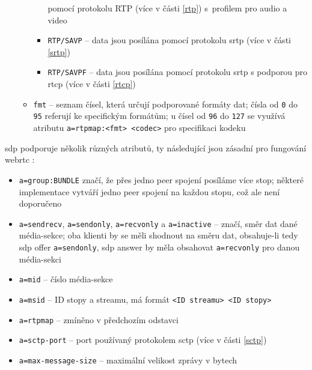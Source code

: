 \begin{itemize}
\begin{itemize}
\begin{itemize}
                              pomocí protokolu RTP (více v části \ref{rtp})
                              s~profilem pro audio a video
                        \item \texttt{RTP/SAVP} -- data jsou posílána
                              pomocí protokolu \gls{srtp} (více v části
                              \ref{srtp})
                        \item \texttt{RTP/SAVPF} -- data jsou posílána
                              pomocí protokolu \gls{srtp} s podporou pro
                              \gls{rtcp} (více v části \ref{rtcp})
                    \end{itemize}
              \item \texttt{fmt} -- seznam čísel, která určují
                    podporované formáty dat; čísla od \texttt{0} do
                    \texttt{95} referují ke specifickým formátům; u
                    čísel od \texttt{96} do \texttt{127} se
                    využívá atributu \texttt{a=rtpmap:<fmt> <codec>}
                    pro specifikaci kodeku
          \end{itemize}
\end{itemize}

\gls{sdp} podporuje několik různých atributů, ty následující jsou zásadní pro
fungování \gls{webrtc}
\parencite{WebRTCForTheCurious,IETF-RFC8866,IETF-RFC5888,IETF-RFC8841}:
\begin{itemize}
    \item \texttt{a=group:BUNDLE} značí, že přes jedno peer spojení
          posíláme více stop; některé implementace vytváří jedno peer spojení na
          každou stopu, což ale není doporučeno
    \item \texttt{a=sendrecv}, \texttt{a=sendonly},
          \texttt{a=recvonly} a \texttt{a=inactive} --
          značí, směr dat dané média-sekce; oba klienti by se měli shodnout na
          směru dat, obsahuje-li tedy \gls{sdp} offer
          \texttt{a=sendonly}, \gls{sdp} answer by měla obsahovat
          \texttt{a=recvonly} pro danou média-sekci
    \item \texttt{a=mid} -- číslo média-sekce
    \item \texttt{a=msid} -- ID stopy a streamu, má formát
          \texttt{<ID streamu> <ID stopy>}
    \item \texttt{a=rtpmap} -- zmíněno v předchozím odstavci
    \item \texttt{a=sctp-port} -- port používaný protokolem \gls{sctp}
          (více v části \ref{sctp})
    \item \texttt{a=max-message-size} -- maximální velikost zprávy v
          bytech
\end{itemize}

